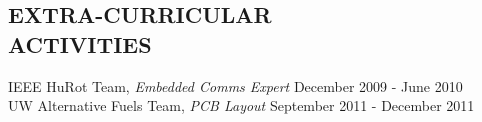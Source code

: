 \documentclass[margin, 10pt]{res} %
\begin{document}
\begin{resume}
\section{EXTRA-CURRICULAR \\ ACTIVITIES} 

IEEE HuRot Team, {\sl Embedded Comms Expert} \hfill December 2009 - June 2010\\
UW Alternative Fuels Team, {\sl PCB Layout} \hfill September 2011 - December 2011 \\
 


\end{resume}
\end{document}
